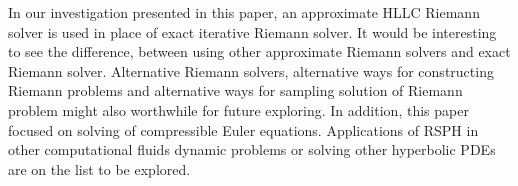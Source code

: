 In our investigation presented in this paper, an approximate HLLC Riemann solver is used in place of exact iterative Riemann solver. It would be interesting to see the difference, between using other approximate Riemann solvers and exact Riemann solver. Alternative Riemann solvers, alternative ways for constructing Riemann problems and alternative ways for sampling solution of Riemann problem might also worthwhile for future exploring. In addition, this paper focused on solving of compressible Euler equations. Applications of RSPH in other computational fluids dynamic problems or solving other hyperbolic PDEs are on the list to be explored.